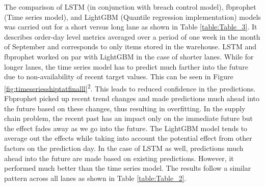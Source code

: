 \documentclass[twoside,leqno,twocolumn]{article}
\begin{document}
The comparison of LSTM (in conjunction with breach control model), fbprophet (Time series model), and LightGBM (Quantile regression implementation) models was carried out for a short versus long lane as shown in Table \ref{table:Table_3}. It describes order-day level metrics averaged over a period of one week in the month of September and corresponds to only items stored in the warehouse. LSTM and fbprophet worked on par with LightGBM in the case of shorter lanes. While for longer lanes, the time series model has to predict much farther into the future due to non-availability of recent target values. This can be seen in Figure \ref{fig:timeseriesshiptatfinalll}\textsuperscript{2}. This leads to reduced confidence in the predictions. Fbprophet picked up recent trend changes and made predictions much ahead into the future based on these changes, thus resulting in overfitting. In the supply chain problem, the recent past has an impact only on the immediate future but the effect fades away as we go into the future. The LightGBM model tends to average out the effects while taking into account the potential effect from other factors on the prediction day. In the case of LSTM as well, predictions much ahead into the future are made based on existing predictions. However, it performed much better than the time series model. The results follow a similar pattern across all lanes as shown in Table \ref{table:Table_2}.
\end{document}
